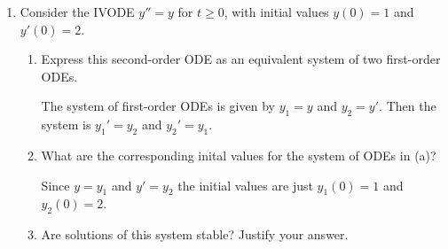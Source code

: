 \documentclass{article}
\begin{document}
\thispagestyle{fancy}
\begin{enumerate}
    \item Consider the IVODE $y'' = y$ for $t \geq 0$, with initial values
        $y(0) = 1$ and $y'(0) = 2$.
        \begin{enumerate}
            \item Express this second-order ODE as an equivalent system of
                two first-order ODEs.

                The system of first-order ODEs is given by $y_1 = y$ and 
                $y_2 = y'$. Then the system is $y_1' = y_2$ and $y_2' =
                y_1$.

            \item What are the corresponding inital values for the system
                of ODEs in (a)?

                Since $y = y_1$ and $y' = y_2$ the initial values are just
                $y_1(0) = 1$ and $y_2(0) = 2$.

            \item Are solutions of this system stable? Justify your answer.


\end{enumerate}
\end{enumerate}
\end{document}
